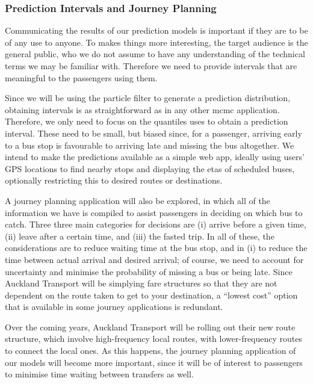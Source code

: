 \documentclass[12pt,a4paper]{article}
\begin{document}
\subsubsection*{Prediction Intervals and Journey Planning}

Communicating the results of our prediction models is important if they are to be of any use to anyone.
To makes things more interesting, the target audience is the general public,
who we do not assume to have any understanding of the technical terms we may be familiar with.
Therefore we need to provide intervals that are meaningful to the passengers using them.


Since we will be using the particle filter to generate a prediction distribution,
obtaining intervals is as straightforward as in any other \gls{mcmc} application.
Therefore, we only need to focus on the quantiles uses to obtain a prediction interval.
These need to be small, 
but biased since, for a passenger, 
arriving early to a bus stop is favourable to arriving late and missing the bus altogether.
We intend to make the predictions available as a simple web app,
ideally using users' GPS locations to find nearby stops and displaying the \glspl{eta} of 
scheduled buses,
optionally restricting this to desired routes or destinations.


A journey planning application will also be explored,
in which all of the information we have is compiled to assist passengers
in deciding on which bus to catch.
Three three main categories for decisions are
(i) arrive before a given time, (ii) leave after a certain time,
and (iii) the fasted trip.
In all of these, the considerations are to reduce waiting time at the bus stop,
and in (i) to reduce the time between actual arrival and desired arrival;
of course, we need to account for uncertainty and minimise the probability of missing a bus
or being late.
Since Auckland Transport will be simplying fare structures so that they are not dependent 
on the route taken to get to your destination,
a ``lowest cost'' option that is available in some journey applications is redundant.


Over the coming years, Auckland Transport will be rolling out their new route structure,
which involve high-frequency local routes, 
with lower-frequency routes to connect the local ones.
As this happens, the journey planning application of our models will become more important,
since it will be of interest to passengers to minimise time waiting between transfers as well.
\end{document}
